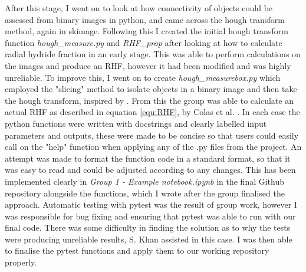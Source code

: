 \documentclass{article}
\begin{document}
After this stage, I went on to look at how connectivity of objects could be assessed from binary images in python, and came across the hough transform method, again in skimage. Following this I created the initial hough transform function \textit{hough\_measure.py} and \textit{RHF\_prop} after looking at how to calculate radial hydride fraction in an early stage. This was able to perform calculations on the images and produce an RHF, however it had been modified and was highly unreliable. To improve this, I went on to create \textit{hough\_measurebox.py} which employed the "slicing" method to isolate objects in a binary image and then take the hough transform, inspired by \cite{Maric2021}. From this the group was able to calculate an actual RHF as described in equation \ref{equ:RHF}, by Colas et al. \cite{Colas2013}. In each case the python functions were written with docstrings and clearly labelled input parameters and outputs, these were made to be concise so that users could easily call on the "help" function when applying any of the .py files from the project. An attempt was made to format the function code in a standard format, so that it was easy to read and could be adjusted according to any changes. This has been implemented clearly in \textit{Group 1 - Example notebook.ipynb} in the final Github repository alongside the functions, which I wrote after the group finalised the approach. Automatic testing with pytest was the result of group work, however I was responsible for bug fixing and ensuring that pytest was able to run with our final code. There was some difficulty in finding the solution as to why the tests were producing unreliable results, S. Khan assisted in this case. I was then able to finalise the pytest functions and apply them to our working repository properly.
\end{document}
